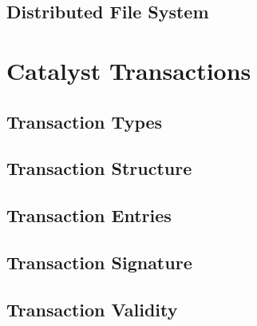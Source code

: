 \documentclass[a4paper, 12pt]{article}
\begin{document}


\subsection{Distributed File System}\label{SecDFS}




 \newpage
 
\section{Catalyst Transactions} \label{Cha:Tra}




\subsection{Transaction Types} \label{Sec:Typ}



\subsection{Transaction Structure} \label{Sec:TStru}




\subsection{Transaction Entries}\label{Sec:TEnt}



\subsection{Transaction Signature}\label{Sec:Sig}




\subsection{Transaction Validity} \label{Sec:Val}


\end{document}
